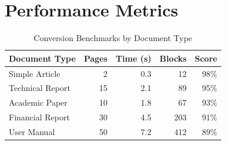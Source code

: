 \documentclass[12pt]{article}
\begin{document}
\section{Performance Metrics}
\begin{table}[h]
\centering
\caption{Conversion Benchmarks by Document Type}
\begin{tabular}{|l|r|r|r|r|}
\hline
\textbf{Document Type} & \textbf{Pages} & \textbf{Time (s)} & \textbf{Blocks} & \textbf{Score} \\
\hline
Simple Article & 2 & 0.3 & 12 & 98\% \\
Technical Report & 15 & 2.1 & 89 & 95\% \\
Academic Paper & 10 & 1.8 & 67 & 93\% \\
Financial Report & 30 & 4.5 & 203 & 91\% \\
User Manual & 50 & 7.2 & 412 & 89\% \\
\hline
\end{tabular}
\end{table}
\end{document}
